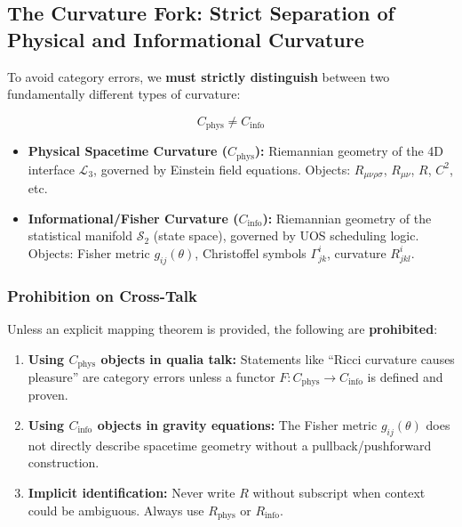 
\subsection{The Curvature Fork: Strict Separation of Physical and Informational Curvature}
\label{sec:curvature-fork-strict}

\begin{tcolorbox}[colback=red!5!white,colframe=red!75!black,title=Critical Distinction (Enforced Throughout)]
To avoid category errors, we \textbf{must strictly distinguish} between two fundamentally different types of curvature:

\[
\boxed{C_{\mathrm{phys}} \neq C_{\mathrm{info}}}
\]

\begin{itemize}
\item \textbf{Physical Spacetime Curvature ($C_{\mathrm{phys}}$):} Riemannian geometry of the 4D interface $\mathcal{L}_3$, governed by Einstein field equations. Objects: $R_{\mu\nu\rho\sigma}$, $R_{\mu\nu}$, $R$, $C^2$, etc.

\item \textbf{Informational/Fisher Curvature ($C_{\mathrm{info}}$):} Riemannian geometry of the statistical manifold $\mathcal{S}_2$ (state space), governed by UOS scheduling logic. Objects: Fisher metric $g_{ij}(\theta)$, Christoffel symbols $\Gamma^i_{jk}$, curvature $R^i_{jkl}$.
\end{itemize}
\end{tcolorbox}

\subsubsection{Prohibition on Cross-Talk}
Unless an explicit mapping theorem is provided, the following are \textbf{prohibited}:

\begin{enumerate}
\item \textbf{Using $C_{\mathrm{phys}}$ objects in qualia talk:} Statements like ``Ricci curvature causes pleasure'' are category errors unless a functor $F: C_{\mathrm{phys}} \to C_{\mathrm{info}}$ is defined and proven.

\item \textbf{Using $C_{\mathrm{info}}$ objects in gravity equations:} The Fisher metric $g_{ij}(\theta)$ does not directly describe spacetime geometry without a pullback/pushforward construction.

\item \textbf{Implicit identification:} Never write $R$ without subscript when context could be ambiguous. Always use $R_{\mathrm{phys}}$ or $R_{\mathrm{info}}$.
\end{enumerate}

